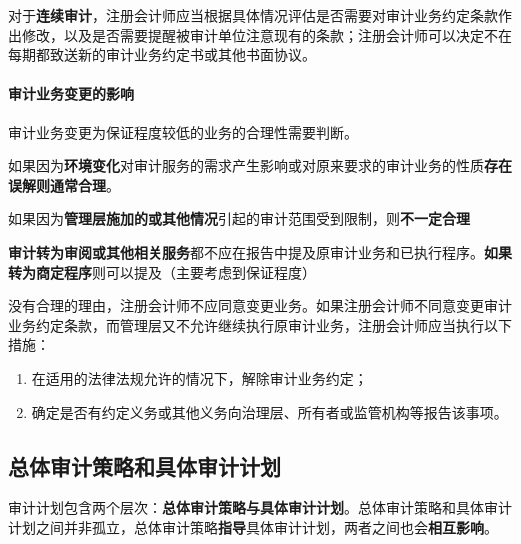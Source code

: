 \documentclass[UTF8,12pt]{ctexart}
\numberwithin{equation}{section} %
\numberwithin{figure}{section}
\numberwithin{table}{section}
\begin{document}
	对于\textbf{连续审计}，注册会计师应当根据具体情况评估是否需要对审计业务约定条款作出修改，以及是否需要提醒被审计单位注意现有的条款；注册会计师可以决定不在每期都致送新的审计业务约定书或其他书面协议。
	
	\paragraph{审计业务变更的影响}
	审计业务变更为保证程度较低的业务的合理性需要判断。
	
	如果因为\textbf{环境变化}对审计服务的需求产生影响或对原来要求的审计业务的性质\textbf{存在误解}\textbf{则通常合理}。
	
	如果因为\textbf{管理层施加的或其他情况}引起的审计范围受到限制，则\textbf{不一定合理}
	
	\textbf{审计转为审阅或其他相关服务}都不应在报告中提及原审计业务和已执行程序。\textbf{如果转为商定程序}则可以提及（主要考虑到保证程度）
	
	没有合理的理由，注册会计师不应同意变更业务。如果注册会计师不同意变更审计业务约定条款，而管理层又不允许继续执行原审计业务，注册会计师应当执行以下措施：
	\begin{enumerate}
		\item 在适用的法律法规允许的情况下，解除审计业务约定；
		
		\item 确定是否有约定义务或其他义务向治理层、所有者或监管机构等报告该事项。
	\end{enumerate}
	
	\subsection{总体审计策略和具体审计计划}
	
	审计计划包含两个层次：\textbf{总体审计策略与具体审计计划}。总体审计策略和具体审计计划之间并非孤立，总体审计策略\textbf{指导}具体审计计划，两者之间也会\textbf{相互影响}。
	
\end{document}
